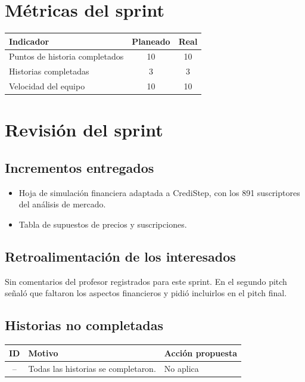 \documentclass[11pt,a4paper]{article}
\begin{document}
\section{Métricas del sprint}

\begin{tabularx}{\textwidth}{X c c}
  \toprule
  \textbf{Indicador} & \textbf{Planeado} & \textbf{Real} \\
  \midrule
  Puntos de historia completados & 10 & 10 \\
  Historias completadas          & 3 & 3 \\
  Velocidad del equipo           & 10 & 10 \\
  \bottomrule
\end{tabularx}

\section{Revisión del sprint}

\subsection{Incrementos entregados}
\begin{itemize}[leftmargin=1.5em]
  \item {Hoja de simulación financiera adaptada a CrediStep, con los 891 suscriptores del análisis de mercado.}
  \item {Tabla de supuestos de precios y suscripciones.}
\end{itemize}

\subsection{Retroalimentación de los interesados}
{Sin comentarios del profesor registrados para este sprint. En el segundo pitch señaló que faltaron los aspectos financieros y pidió incluirlos en el pitch final.}

\subsection{Historias no completadas}
\begin{tabularx}{\textwidth}{c X X}
  \toprule
  \textbf{ID} & \textbf{Motivo} & \textbf{Acción propuesta} \\
  \midrule
  -- & Todas las historias se completaron. & No aplica \\
  \bottomrule
\end{tabularx}
\end{document}
